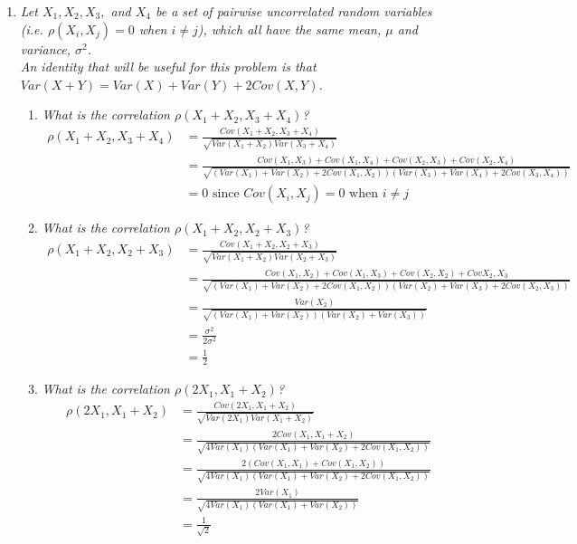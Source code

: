 \documentclass{article} %
\begin{document}
\begin{enumerate}
	\item \textit{Let $X_1, X_2, X_3,$ and $X_4$ be a set of pairwise uncorrelated random variables (i.e. $\rho(X_i, X_j) = 0$ when $i \neq j$), which all have the same mean, $\mu$ and variance, $\sigma^2$.\\
	An identity that will be useful for this problem is that $Var(X + Y) = Var(X) + Var(Y) + 2Cov(X, Y)$.}
	\begin{enumerate}
		\item \textit{What is the correlation $\rho(X_1 + X_2, X_3 + X_4)$?}
		\begin{align*}
		\rho(X_1 + X_2, X_3 + X_4) &= \frac{Cov(X_1 + X_2, X_3 + X_4)}{\sqrt{Var(X_1 + X_2) Var(X_3 + X_4)}}\\
		&= \frac{Cov(X_1, X_3) + Cov(X_1, X_4) + Cov(X_2, X_3) + Cov(X_2, X_4)}{\sqrt{(Var(X_1) + Var(X_2) + 2Cov(X_1, X_2))(Var(X_3) + Var(X_4) + 2Cov(X_3, X_4))}}\\
		&= 0 \text{ since } Cov(X_i, X_j) = 0 \text{ when } i \neq j
		\end{align*}
		
		\item \textit{What is the correlation $\rho(X_1 + X_2, X_2 + X_3)$?}
		\begin{align*}
		\rho(X_1 + X_2, X_2 + X_3) &= \frac{Cov(X_1 + X_2, X_2 + X_3)}{\sqrt{Var(X_1 + X_2) Var(X_2 + X_3)}}\\
		&= \frac{Cov(X_1, X_2) + Cov(X_1, X_3) + Cov(X_2, X_2) + Cov{X_2, X_3}}{\sqrt{(Var(X_1) + Var(X_2) + 2Cov(X_1, X_2))(Var(X_2) + Var(X_3) + 2Cov(X_2, X_3))}}\\
		&= \frac{Var(X_2)}{\sqrt{(Var(X_1) + Var(X_2))(Var(X_2) + Var(X_3))}}\\
		&= \frac{\sigma^2}{2\sigma^2}\\
		&= \frac{1}{2}
		\end{align*}
		
		\item \textit{What is the correlation $\rho(2X_1, X_1 + X_2)$?}
		\begin{align*}
		\rho(2X_1, X_1 + X_2) &= \frac{Cov(2X_1, X_1 + X_2)}{\sqrt{Var(2X_1) Var(X_1 + X_2)}}\\
		&= \frac{2Cov(X_1, X_1 + X_2)}{\sqrt{4Var(X_1)(Var(X_1) + Var(X_2) + 2Cov(X_1, X_2))}}\\
		&= \frac{2(Cov(X_1, X_1) + Cov(X_1, X_2))}{\sqrt{4Var(X_1)(Var(X_1) + Var(X_2) + 2Cov(X_1, X_2))}}\\
		&= \frac{2Var(X_1)}{\sqrt{4Var(X_1)(Var(X_1) + Var(X_2))}}\\
		&= \frac{1}{\sqrt{2}}
		\end{align*}
		

\end{enumerate}
\end{enumerate}
\end{document}
